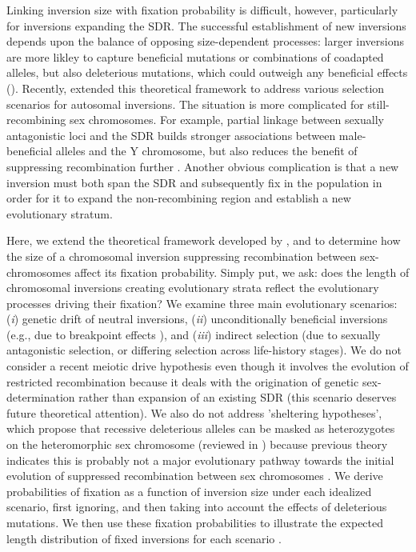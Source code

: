 \documentclass{article}
\begin{document}
Linking inversion size with fixation probability is difficult, however, particularly for inversions expanding the SDR. The successful establishment of new inversions depends upon the balance of opposing size-dependent processes: larger inversions are more likley to capture beneficial mutations or combinations of coadapted alleles, but also deleterious mutations, which could outweigh any beneficial effects (\citealt{Nei1967,vanValenLevins1968, Santos1986, ChengKirkpatrick2019}). Recently, \citet{ConnallonOlito2020} extended this theoretical framework to address various selection scenarios for autosomal inversions. The situation is more complicated for still-recombining sex chromosomes. For example, partial linkage between sexually antagonistic loci and the SDR builds stronger associations between male-beneficial alleles and the Y chromosome, but also reduces the benefit of suppressing recombination further \citep{Nei1969,Otto2019}. Another obvious complication is that a new inversion must both span the SDR and subsequently fix in the population in order for it to expand the non-recombining region and establish a new evolutionary stratum. 

Here, we extend the theoretical framework developed by \citet{vanValenLevins1968, Santos1986}, and \citet{ConnallonOlito2020} to determine how the size of a chromosomal inversion suppressing recombination between sex-chromosomes affect its fixation probability. Simply put, we ask: does the length of chromosomal inversions creating evolutionary strata reflect the evolutionary processes driving their fixation? We examine three main evolutionary scenarios: ({\itshape i}) genetic drift of neutral inversions, ({\itshape ii}) unconditionally beneficial inversions (e.g., due to breakpoint effects \citealt{CorbettDetig2016}), and ({\itshape iii}) indirect selection (due to sexually antagonistic selection, or differing selection across life-history stages). We do not consider a recent meiotic drive hypothesis \citep{UbedaPatten2010} even though it involves the evolution of restricted recombination because it deals with the origination of genetic sex-determination rather than expansion of an existing SDR (this scenario deserves future theoretical attention). We also do not address 'sheltering hypotheses', which propose that recessive deleterious alleles can be masked as heterozygotes on the heteromorphic sex chromosome (reviewed in \citealt{Ironside2010, Ponnikas2018, Charlesworth2017}) because previous theory indicates this is probably not a major evolutionary pathway towards the initial evolution of suppressed recombination between sex chromosomes \citep{Fisher1935, Olito2020}. We derive probabilities of fixation as a function of inversion size under each idealized scenario, first ignoring, and then taking into account the effects of deleterious mutations. We then use these fixation probabilities to illustrate the expected length distribution of fixed inversions for each scenario \citep[after][]{vanValenLevins1968,Santos1986}. 
\end{document}
